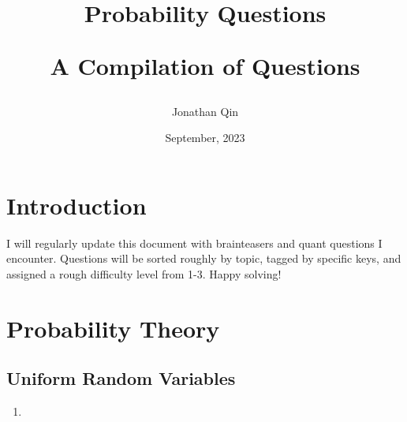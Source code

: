 \documentclass{article}
\title{

\begin{center} \textbf{Probability Questions}

A Compilation of Questions \end{center}
}
\author{Jonathan Qin}
\date{September, 2023}
\begin{document}
\maketitle

\section{Introduction}
I will regularly update this document with brainteasers and quant questions I encounter. Questions will be sorted roughly by topic, tagged by specific keys, and assigned a rough difficulty level from 1-3. Happy solving!

\section{Probability Theory}
\subsection{Uniform Random Variables}
\begin{enumerate}
    \item 
\end{enumerate}
\end{document}

